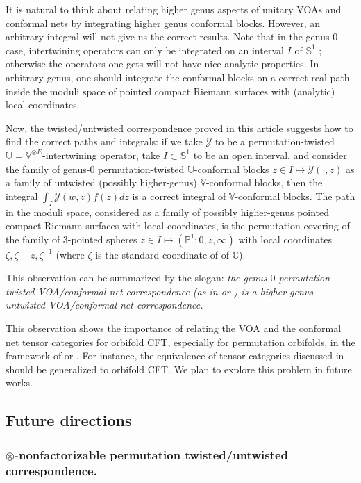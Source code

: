 \documentclass[11pt,b5paper,notitlepage]{article}
\theoremstyle{definition}
\theoremstyle{plain}
\newcommand{\mc}{\mathcal}
\newcommand{\mbb}{\mathbb}
\newcommand{\Vbb}{\mathbb V}
\newcommand{\Ubb}{\mathbb U}
\newcommand{\Cbb}{\mathbb C}
\newcommand{\Pbb}{\mathbb P}
\numberwithin{equation}{subsection}
\begin{document}
It is natural to think about relating higher genus aspects of unitary VOAs and conformal nets by integrating higher genus conformal blocks. However, an arbitrary integral will not give us the correct results. Note that in the genus-$0$ case, intertwining operators can only be integrated on an interval $I$ of $\mbb S^1$ ; otherwise the operators one gets will not have nice analytic properties. In arbitrary genus, one should integrate the conformal blocks on a correct real path inside the moduli space of pointed compact Riemann surfaces with (analytic) local coordinates.

Now, the twisted/untwisted correspondence proved in this article suggests how to find the correct paths and integrals: if we take $\mc Y$ to be a permutation-twisted $\Ubb=\Vbb^{\otimes E}$-intertwining operator, take $I\subset \mbb S^1$ to be an open interval, and consider the family of genus-$0$ permutation-twisted $\Ubb$-conformal blocks $z\in I\mapsto \mc Y(\cdot,z)$ as a family of untwisted (possibly higher-genus) $\Vbb$-conformal blocks, then the integral $\int_I \mc Y(w,z)f(z)dz$ is a correct integral of $\Vbb$-conformal blocks. The path in the moduli space, considered as a family of possibly higher-genus pointed compact Riemann surfaces with local coordinates, is the permutation covering of the family of $3$-pointed spheres $z\in I\mapsto (\Pbb^1;0,z,\infty)$ with local coordinates $\zeta,\zeta-z,\zeta^{-1}$ (where $\zeta$ is the standard coordinate of of $\Cbb$). 

This observation can be summarized by the slogan: \emph{the genus-$0$ permutation-twisted VOA/conformal net correspondence (as in \cite{CKLW18} or \cite{Ten19a}) is a higher-genus untwisted VOA/conformal net correspondence.}

This observation shows the  importance of relating the VOA and the conformal net tensor categories  for orbifold CFT, especially for permutation orbifolds, in the framework of \cite{CKLW18} or \cite{Ten19a}. For instance, the equivalence of tensor categories discussed in \cite{Gui21,Gui20a} should be generalized to orbifold CFT. We plan to explore this problem in future works.




\subsection{Future directions}



\subsubsection*{$\otimes$-nonfactorizable permutation twisted/untwisted correspondence.}
\end{document}
